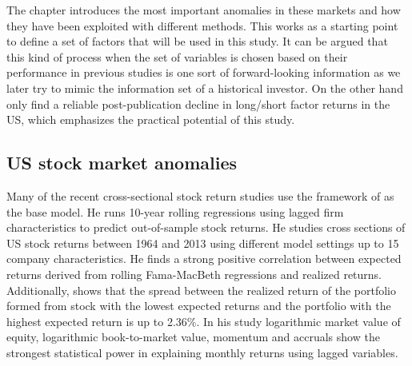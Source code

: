 \documentclass[12pt]{article}
\begin{document}
The chapter introduces the most important anomalies in these markets and how they have been exploited with different methods. This works as a starting point to define a set of factors that will be used in this study. It can be argued that this kind of process when the set of variables is chosen based on their performance in previous studies is one sort of forward-looking information as we later try to mimic the information set of a historical investor. On the other hand \citet{JACOBS2020213} only find a reliable post-publication decline in long/short factor returns in the US, which emphasizes the practical potential of this study. \footnotemark {}  \par

\subsection{US stock market anomalies}\label{USStockMarketAnomalies}

Many of the recent cross-sectional stock return studies use the framework of \citet{Lewellen2015} as the base model. He runs 10-year rolling \citet{FamaMacBeth1973} regressions using lagged firm characteristics to predict out-of-sample stock returns. He studies cross sections of US stock returns between 1964 and 2013 using different model settings up to 15 company characteristics.\footnotemark {} He finds a strong positive correlation between expected returns derived from rolling Fama-MacBeth regressions and realized returns. Additionally, \citeauthor{Lewellen2015} shows that the spread between the realized return of the portfolio formed from stock with the lowest expected returns and the portfolio with the highest expected return is up to 2.36\%. In his study logarithmic market value of equity, logarithmic book-to-market value, momentum and accruals show the strongest statistical power in explaining monthly returns using lagged variables.\footnotemark {} \par
\end{document}
